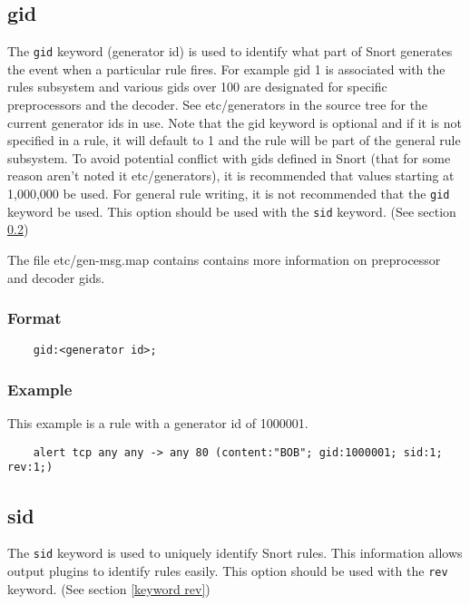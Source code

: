 \documentclass[english]{report}
\begin{document}
\subsection{gid}
\label{keyword gid}

The \texttt{gid} keyword (generator id) is used to identify what part of Snort
generates the event when a particular rule fires.  For example gid 1 is
associated with the rules subsystem and various gids over 100 are designated
for specific preprocessors and the decoder.  See etc/generators in the source
tree for the current generator ids in use.  Note that the gid keyword is
optional and if it is not specified in a rule, it will default to 1 and the
rule will be part of the general rule subsystem.  To avoid potential conflict
with gids defined in Snort (that for some reason aren't noted it
etc/generators), it is recommended that values starting at 1,000,000 be used.
For general rule writing, it is not recommended that the \texttt{gid} keyword
be used.  This option should be used with the \texttt{sid} keyword.  (See
section \ref{keyword sid})

The file etc/gen-msg.map contains contains more information on preprocessor and
decoder gids.

\subsubsection{Format}

\begin{verbatim}
    gid:<generator id>;
\end{verbatim}

\subsubsection{Example}

This example is a rule with a generator id of 1000001. 

\begin{verbatim}
    alert tcp any any -> any 80 (content:"BOB"; gid:1000001; sid:1; rev:1;)
\end{verbatim}

\subsection{sid}
\label{keyword sid}

The \texttt{sid} keyword is used to uniquely identify Snort rules. This
information allows output plugins to identify rules easily.  This option should
be used with the \texttt{rev} keyword.  (See section \ref{keyword rev})
\end{document}
